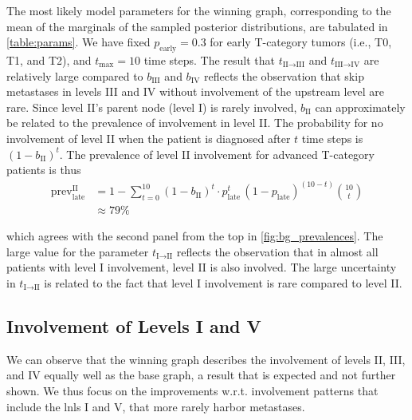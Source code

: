 \documentclass[twocolumn]{article}
\begin{document}
The most likely model parameters for the winning graph, corresponding to the mean of the marginals of the sampled posterior distributions, are tabulated in \cref{table:params}. We have fixed $p_\text{early}=0.3$ for early T-category tumors (i.e., T0, T1, and T2), and $t_\text{max}=10$ time steps. The result that $t_{\text{II} \rightarrow \text{III}}$ and $t_{\text{III} \rightarrow \text{IV}}$ are relatively large compared to $b_\text{III}$ and $b_\text{IV}$ reflects the observation that skip metastases in levels III and IV without involvement of the upstream level are rare. Since level II's parent node (level I) is rarely involved, $b_\text{II}$ can approximately be related to the prevalence of involvement in level II. The probability for no involvement of level II when the patient is diagnosed after $t$ time steps is $\left(1-b_\text{II}\right)^t$. The prevalence of level II involvement for advanced T-category patients is thus
%
\begin{equation}
    \begin{aligned}
        \text{prev}_\text{late}^\text{II} &= 1-\sum_{t=0}^{10} \left(1-b_\text{II}\right)^t \cdot p_\text{late}^t \, (1-p_\text{late})^{(10-t)}\binom{10}{t} \\
        &\approx 79 \%
    \end{aligned}
\end{equation}

which agrees with the second panel from the top in \cref{fig:bg_prevalences}. 
The large value for the parameter $t_{\text{I} \rightarrow \text{II}}$ reflects the observation that in almost all patients with level I involvement, level II is also involved. The large uncertainty in $t_{\text{I} \rightarrow \text{II}}$ is related to the fact that level I involvement is rare compared to level II.


\subsection{Involvement of Levels I and V}

We can observe that the winning graph describes the involvement of levels II, III, and IV equally well as the base graph, a result that is expected and not further shown. We thus focus on the improvements w.r.t. involvement patterns that include the \glspl{lnl} I and V, that more rarely harbor metastases.
\end{document}

